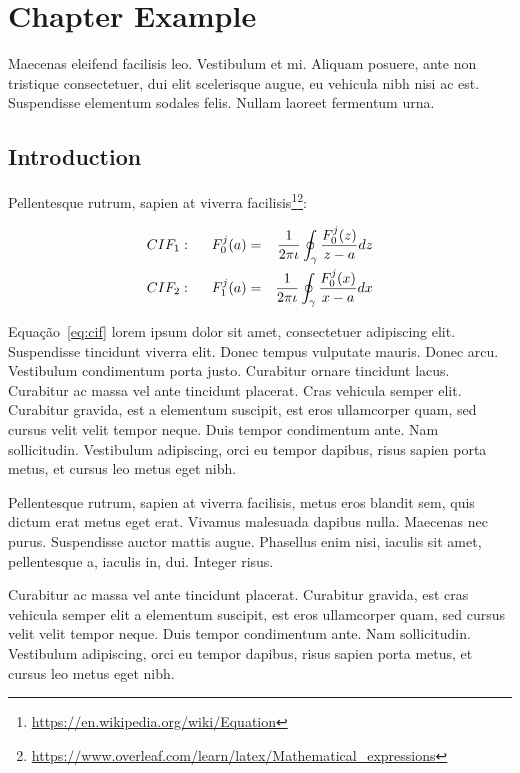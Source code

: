 \chapter{Chapter Example} \label{chap:ch3}

Maecenas eleifend facilisis leo. Vestibulum et
mi. Aliquam posuere, ante non tristique consectetuer, dui elit
scelerisque augue, eu vehicula nibh nisi ac est. 
Suspendisse elementum sodales felis. Nullam laoreet fermentum urna. 

\section{Introduction}

Pellentesque rutrum, sapien at viverra 
facilisis\footnote{\url{https://en.wikipedia.org/wiki/Equation}}\footnote{\url{https://www.overleaf.com/learn/latex/Mathematical_expressions}}:

\begin{eqnarray}
CIF_1: \hspace*{5mm}F_0^j(a) &=& \frac{1}{2\pi \iota} \oint_{\gamma} \frac{F_0^j(z)}{z - a} dz\\
CIF_2: \hspace*{5mm}F_1^j(a) &=& \frac{1}{2\pi \iota} \oint_{\gamma} \frac{F_0^j(x)}{x - a} dx \label{eq:cif}
\end{eqnarray}

Equação~\ref{eq:cif} lorem ipsum dolor sit amet, consectetuer
adipiscing elit. Suspendisse tincidunt viverra elit. Donec tempus
vulputate mauris. Donec arcu. Vestibulum condimentum porta
justo. Curabitur ornare tincidunt lacus. Curabitur ac massa vel ante
tincidunt placerat. Cras vehicula semper elit. Curabitur gravida, est
a elementum suscipit, est eros ullamcorper quam, sed cursus velit
velit tempor neque. Duis tempor condimentum ante. Nam
sollicitudin. Vestibulum adipiscing, orci eu tempor dapibus, risus
sapien porta metus, et cursus leo metus eget nibh. 

Pellentesque rutrum, sapien at viverra facilisis, metus eros blandit
sem, quis dictum erat metus eget erat. Vivamus malesuada dapibus
nulla. Maecenas nec purus. Suspendisse auctor mattis augue. Phasellus
enim nisi, iaculis sit amet, pellentesque a, iaculis in, dui. Integer
risus. 

Curabitur ac massa vel ante tincidunt placerat. 
Curabitur gravida, est cras vehicula semper elit
a elementum suscipit, est eros ullamcorper quam, sed cursus velit
velit tempor neque. Duis tempor condimentum ante. Nam
sollicitudin. Vestibulum adipiscing, orci eu tempor dapibus, risus
sapien porta metus, et cursus leo metus eget nibh.

